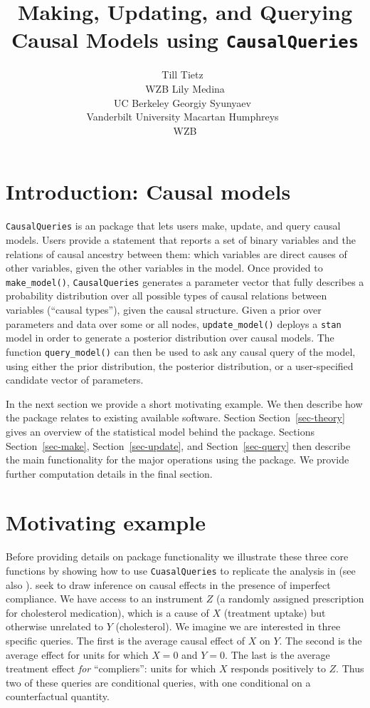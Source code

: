 \documentclass[
  11pt,
  article]{jss}
\author{Till Tietz~\orcidlink{0000-0002-2916-9059}\\WZB \And Lily
Medina\\UC Berkeley \AND Georgiy
Syunyaev~\orcidlink{0000-0002-4391-6313}\\Vanderbilt
University \And Macartan Humphreys~\orcidlink{0000-0001-7029-2326}\\WZB}
\title{Making, Updating, and Querying Causal Models using
\texttt{CausalQueries}}
\begin{document}
\maketitle
\hypertarget{sec-intro}{%
\section{Introduction: Causal models}\label{sec-intro}}

\texttt{CausalQueries} is an  package that lets users make,
update, and query causal models. Users provide a statement that reports
a set of binary variables and the relations of causal ancestry between
them: which variables are direct causes of other variables, given the
other variables in the model. Once provided to \texttt{make\_model()},
\texttt{CausalQueries} generates a parameter vector that fully describes
a probability distribution over all possible types of causal relations
between variables (``causal types''), given the causal structure. Given
a prior over parameters and data over some or all nodes,
\texttt{update\_model()} deploys a \texttt{stan} model in order to
generate a posterior distribution over causal models. The function
\texttt{query\_model()} can then be used to ask any causal query of the
model, using either the prior distribution, the posterior distribution,
or a user-specified candidate vector of parameters.

In the next section we provide a short motivating example. We then
describe how the package relates to existing available software. Section
Section~\ref{sec-theory} gives an overview of the statistical model
behind the package. Sections Section~\ref{sec-make},
Section~\ref{sec-update}, and Section~\ref{sec-query} then describe the
main functionality for the major operations using the package. We
provide further computation details in the final section.

\hypertarget{motivating-example}{%
\section{Motivating example}\label{motivating-example}}

Before providing details on package functionality we illustrate these
three core functions by showing how to use \texttt{CuasalQueries} to
replicate the analysis in \citet{chickering1996clinician} (see also
\citet{ii2023}). \citet{chickering1996clinician} seek to draw inference
on causal effects in the presence of imperfect compliance. We have
access to an instrument \(Z\) (a randomly assigned prescription for
cholesterol medication), which is a cause of \(X\) (treatment uptake)
but otherwise unrelated to \(Y\) (cholesterol). We imagine we are
interested in three specific queries. The first is the average causal
effect of \(X\) on \(Y\). The second is the average effect for units for
which \(X=0\) and \(Y=0\). The last is the average treatment effect
\emph{for} ``compliers'': units for which \(X\) responds positively to
\(Z\). Thus two of these queries are conditional queries, with one
conditional on a counterfactual quantity.
\end{document}
